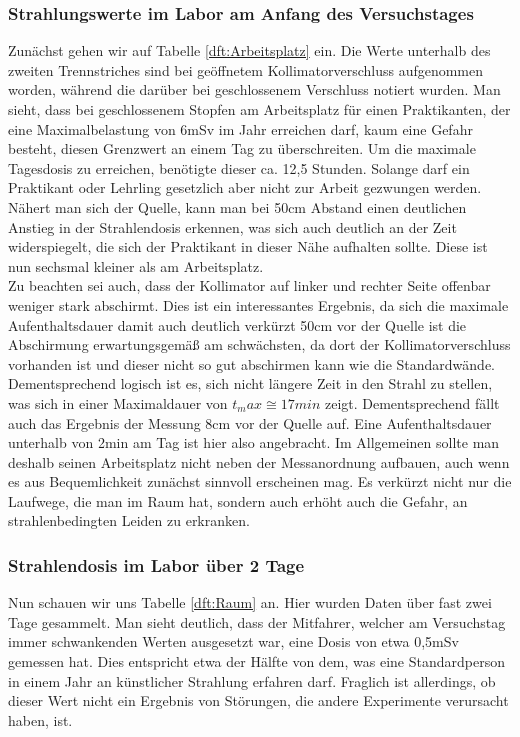 \subsubsection{Strahlungswerte im Labor am Anfang des Versuchstages}
Zunächst gehen wir auf Tabelle \ref{dft:Arbeitsplatz} ein. Die Werte unterhalb des zweiten Trennstriches sind bei geöffnetem Kollimatorverschluss aufgenommen worden, während die darüber bei geschlossenem Verschluss notiert wurden. 
Man sieht, dass bei geschlossenem Stopfen  am Arbeitsplatz für einen Praktikanten, der eine Maximalbelastung von 6mSv im Jahr erreichen darf, kaum eine Gefahr besteht, diesen Grenzwert an einem Tag zu überschreiten. Um die maximale Tagesdosis zu erreichen, benötigte dieser ca. 12,5 Stunden. Solange darf ein Praktikant oder Lehrling gesetzlich aber nicht zur Arbeit gezwungen werden.\\
Nähert man sich der Quelle, kann man bei 50cm Abstand einen deutlichen Anstieg in der Strahlendosis erkennen, was sich auch deutlich an der Zeit widerspiegelt, die sich der Praktikant in dieser Nähe aufhalten sollte. Diese ist nun sechsmal kleiner als am Arbeitsplatz.\\
Zu beachten sei auch, dass der Kollimator auf linker und rechter Seite offenbar weniger stark abschirmt. Dies ist ein interessantes Ergebnis, da sich die maximale Aufenthaltsdauer damit auch deutlich verkürzt 50cm vor der Quelle ist die Abschirmung erwartungsgemäß am schwächsten, da dort der Kollimatorverschluss vorhanden ist und dieser nicht so gut abschirmen kann wie die Standardwände. Dementsprechend logisch ist es, sich nicht längere Zeit in den Strahl zu stellen, was sich in einer Maximaldauer von $t_max \cong 17min$ zeigt. Dementsprechend fällt auch das Ergebnis der Messung 8cm vor der Quelle auf. Eine Aufenthaltsdauer unterhalb von 2min am Tag ist hier also angebracht.
Im Allgemeinen sollte man deshalb seinen Arbeitsplatz nicht neben der Messanordnung aufbauen, auch wenn es aus Bequemlichkeit zunächst sinnvoll erscheinen mag. Es verkürzt nicht nur die Laufwege, die man im Raum hat, sondern auch erhöht auch die Gefahr, an strahlenbedingten Leiden zu erkranken.

\subsubsection{Strahlendosis im Labor über 2 Tage}
Nun schauen wir uns Tabelle \ref{dft:Raum} an. Hier wurden Daten über fast zwei Tage gesammelt. Man sieht deutlich, dass der Mitfahrer, welcher am Versuchstag immer schwankenden Werten ausgesetzt war, eine Dosis von etwa 0,5mSv gemessen hat. Dies entspricht etwa der Hälfte von dem, was eine Standardperson in einem Jahr an künstlicher Strahlung erfahren darf. Fraglich ist allerdings, ob dieser Wert nicht ein Ergebnis von Störungen, die andere Experimente verursacht haben, ist.  